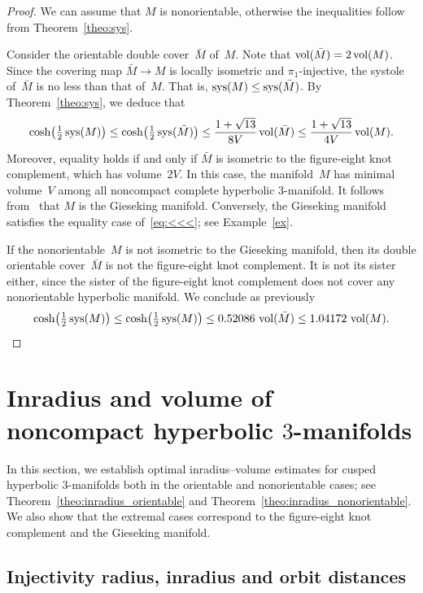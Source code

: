 \documentclass[11pt,reqno]{amsart}
\theoremstyle{definition}
\numberwithin{equation}{section}
\DeclareMathOperator{\vol}{{\rm vol}}
\DeclareMathOperator{\sys}{{\rm sys}}
\numberwithin{equation}{section}
\begin{document}
\begin{proof}
We can assume that $M$ is nonorientable, otherwise the inequalities follow from Theorem~\ref{theo:sys}.

Consider the orientable double cover~$\bar{M}$ of~$M$.
Note that $\vol(\bar{M}) = 2 \vol(M)$.
Since the covering map $\bar{M} \to M$ is locally isometric and $\pi_1$-injective, the systole of~$\bar{M}$ is no less than that of~$M$.
That is, $\sys(M) \leq \sys(\bar{M})$.
By Theorem~\ref{theo:sys}, we deduce that
\begin{equation} \label{eq:<<<}
\cosh \!\left(\tfrac{1}{2} \sys(M) \right) \leq \cosh \!\left(\tfrac{1}{2} \sys(\bar{M}) \right) \leq \frac{1+\sqrt{13}}{8 V} \vol(\bar{M}) \leq  \frac{1+\sqrt{13}}{4 V} \vol(M).
\end{equation}
Moreover, equality holds if and only if $\bar{M}$ is isometric to the figure-eight knot complement, which has volume~$2V$.
In this case, the manifold~$M$ has minimal volume~$V$ among all noncompact complete hyperbolic $3$-manifold.
It follows from~\cite{adams_minvol} that $M$ is the Gieseking manifold.
Conversely, the Gieseking manifold satisfies the equality case of~\eqref{eq:<<<}; see Example~\ref{ex}.

If the nonorientable~$M$ is not isometric to the Gieseking manifold, then its double orientable cover~$\bar{M}$ is not the figure-eight knot complement.
It is not its sister either, since the sister of the figure-eight knot complement does not cover any nonorientable hyperbolic manifold.
We conclude as previously
\[
\cosh \!\left(\tfrac{1}{2} \sys(M) \right) \leq \cosh \!\left(\tfrac{1}{2} \sys(M) \right) \leq 0.52086 \, \vol(\bar{M}) \leq  1.04172 \, \vol(M).
\]
\end{proof}






\section{Inradius and volume of noncompact hyperbolic \texorpdfstring{$3$}{3}-manifolds}

In this section, we establish optimal inradius--volume estimates for cusped hyperbolic $3$-manifolds both in the orientable and nonorientable cases; see Theorem~\ref{theo:inradius_orientable} and Theorem~\ref{theo:inradius_nonorientable}.
We also show that the extremal cases correspond to the figure-eight knot complement and the Gieseking manifold.

\subsection{Injectivity radius, inradius and orbit distances}
\end{document}
